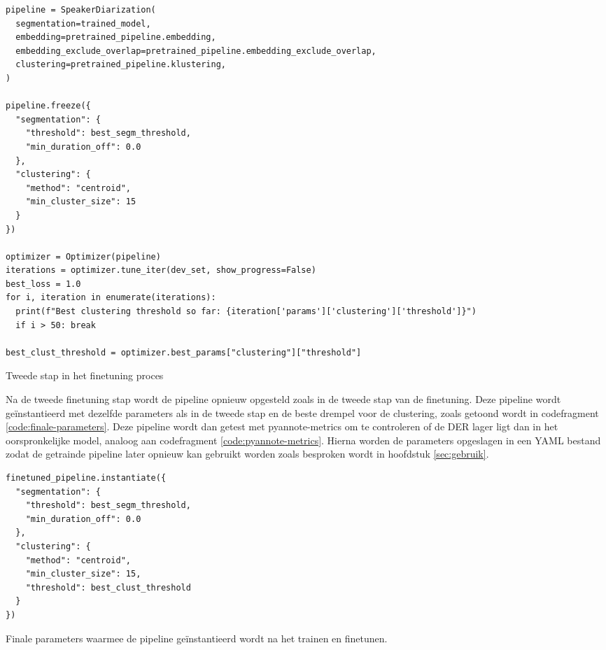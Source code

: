 \begin{listing}
	\begin{verbatim}
pipeline = SpeakerDiarization(
  segmentation=trained_model,
  embedding=pretrained_pipeline.embedding,
  embedding_exclude_overlap=pretrained_pipeline.embedding_exclude_overlap,
  clustering=pretrained_pipeline.klustering,
)

pipeline.freeze({
  "segmentation": {
    "threshold": best_segm_threshold,
    "min_duration_off": 0.0
  },
  "clustering": {
    "method": "centroid",
    "min_cluster_size": 15
  }
})

optimizer = Optimizer(pipeline)
iterations = optimizer.tune_iter(dev_set, show_progress=False)
best_loss = 1.0
for i, iteration in enumerate(iterations):
  print(f"Best clustering threshold so far: {iteration['params']['clustering']['threshold']}")
  if i > 50: break
  
best_clust_threshold = optimizer.best_params["clustering"]["threshold"]
	\end{verbatim}
	\caption[Set-up voor tweede finetuning]{\label{code:tweede-finetuning}Tweede stap in het finetuning proces}
\end{listing}

Na de tweede finetuning stap wordt de pipeline opnieuw opgesteld zoals in de tweede stap van de finetuning. Deze pipeline wordt geïnstantieerd met dezelfde parameters als in de tweede stap en de beste drempel voor de clustering, zoals getoond wordt in codefragment \ref{code:finale-parameters}. Deze pipeline wordt dan getest met pyannote-metrics om te controleren of de DER lager ligt dan in het oorspronkelijke model, analoog aan codefragment \ref{code:pyannote-metrics}. Hierna worden de parameters opgeslagen in een YAML bestand zodat de getrainde pipeline later opnieuw kan gebruikt worden zoals besproken wordt in hoofdstuk \ref{sec:gebruik}.

\begin{listing}
	\begin{verbatim}
finetuned_pipeline.instantiate({
  "segmentation": {
    "threshold": best_segm_threshold,
    "min_duration_off": 0.0
  },
  "clustering": {
    "method": "centroid",
    "min_cluster_size": 15,
    "threshold": best_clust_threshold
  }
})
	\end{verbatim}
	\caption[Finale parameters]{\label{code:finale-parameters}Finale parameters waarmee de pipeline geïnstantieerd wordt na het trainen en finetunen.}
\end{listing}

